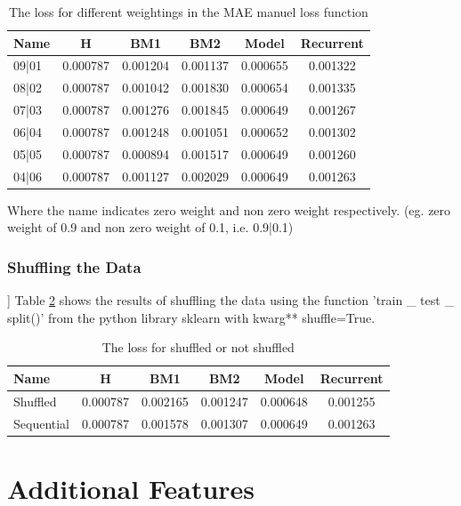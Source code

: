 \begin{table}[htbp]
	\centering
	\caption{The loss for different weightings in the MAE manuel loss function}
	\label{tab:weights}
	\begin{tabular}{p{2cm}ccccc}
		\toprule
		Name &  H &  BM1 &  BM2 &  Model &  Recurrent \\
		\midrule
		09|01 &       0.000787 &        0.001204 &        0.001137 &   0.000655 &            0.001322 \\
		08|02 &       0.000787 &        0.001042 &        0.001830 &   0.000654 &            0.001335 \\
		07|03 &       0.000787 &        0.001276 &        0.001845 &   0.000649 &            0.001267 \\
		06|04 &       0.000787 &        0.001248 &        0.001051 &   0.000652 &            0.001302 \\
		05|05 &       0.000787 &        0.000894 &        0.001517 &   0.000649 &            0.001260 \\
		04|06 &       0.000787 &        0.001127 &        0.002029 &   0.000649 &            0.001263 \\
		\bottomrule
	\end{tabular}
\end{table}
Where the name indicates zero weight and non zero weight respectively. (eg. zero weight of 0.9 and non zero weight of 0.1, i.e. 0.9|0.1)
\subsubsection*{Shuffling the Data}]
Table \ref{tab:suffle} shows the results of shuffling the data using the function 'train \_ test \_ split()' from the python library sklearn with kwarg** shuffle=True.
\begin{table}[h]
	\centering
	\caption{The loss for shuffled or not shuffled}
	\label{tab:suffle}
	\begin{tabular}{p{2cm}ccccc}
		\toprule
		Name &  H &  BM1 &  BM2 &  Model &  Recurrent \\
		\midrule
		Shuffled &       0.000787 &        0.002165 &        0.001247 &   0.000648 &            0.001255 \\
		Sequential &       0.000787 &        0.001578 &        0.001307 &   0.000649 &            0.001263 \\
		\bottomrule
	\end{tabular}
\end{table}

\section{Additional Features}

